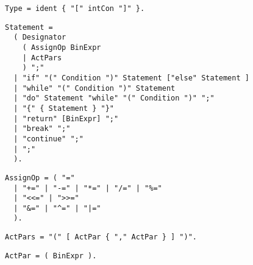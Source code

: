 
\begin{samepage}
\begin{lstlisting}[language=EBNF]
Type = ident { "[" intCon "]" }.
\end{lstlisting}
\end{samepage}


\begin{samepage}
\begin{lstlisting}[language=EBNF]
Statement = 
  ( Designator
    ( AssignOp BinExpr 
    | ActPars
    ) ";" 
  | "if" "(" Condition ")" Statement ["else" Statement ]
  | "while" "(" Condition ")" Statement
  | "do" Statement "while" "(" Condition ")" ";"
  | "{" { Statement } "}"
  | "return" [BinExpr] ";"
  | "break" ";"
  | "continue" ";"
  | ";"
  ).
\end{lstlisting}
\end{samepage}


\begin{samepage}
\begin{lstlisting}[language=EBNF]
AssignOp = ( "=" 
  | "+=" | "-=" | "*=" | "/=" | "%=" 
  | "<<=" | ">>=" 
  | "&=" | "^=" | "|=" 
  ). 
\end{lstlisting}
\end{samepage}


\begin{samepage}
\begin{lstlisting}[language=EBNF]
ActPars = "(" [ ActPar { "," ActPar } ] ")".
\end{lstlisting}
\end{samepage}


\begin{samepage}
\begin{lstlisting}[language=EBNF]
ActPar = ( BinExpr ).
\end{lstlisting}
\end{samepage}

